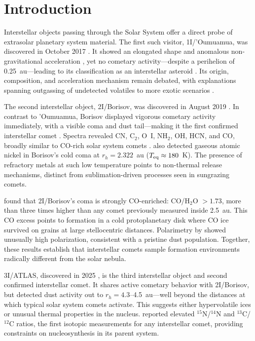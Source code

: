 \documentclass[preprint2]{aastex631}
\begin{document}
\section{Introduction}\label{sec:intro}

Interstellar objects passing through the Solar System offer a direct probe of extrasolar planetary system material. The first such visitor, 1I/'Oumuamua, was discovered in October 2017 \citep{meech17}. It showed an elongated shape and anomalous non-gravitational acceleration \citep{micheli18}, yet no cometary activity---despite a perihelion of 0.25~au---leading to its classification as an interstellar asteroid \citep{jewitt17}. Its origin, composition, and acceleration mechanism remain debated, with explanations spanning outgassing of undetected volatiles \citep{seligman23} to more exotic scenarios \citep{loeb18}.

The second interstellar object, 2I/Borisov, was discovered in August 2019 \citep{guzik19}. In contrast to 'Oumuamua, Borisov displayed vigorous cometary activity immediately, with a visible coma and dust tail---making it the first confirmed interstellar comet \citep{jewitt19}. Spectra revealed CN, C$_{2}$, O~I, NH$_{2}$, OH, HCN, and CO, broadly similar to CO-rich solar system comets \citep{fitzsimmons19,bodewits20}. \citet{guzik21} also detected gaseous atomic nickel in Borisov's cold coma at $r_h = 2.322$~au ($T_{\rm eq} \approx 180$~K). The presence of refractory metals at such low temperature points to non-thermal release mechanisms, distinct from sublimation-driven processes seen in sungrazing comets.

\citet{bodewits20} found that 2I/Borisov's coma is strongly CO-enriched: CO/H$_{2}$O $> 1.73$, more than three times higher than any comet previously measured inside 2.5~au. This CO excess points to formation in a cold protoplanetary disk where CO ice survived on grains at large stellocentric distances. Polarimetry by \citet{bagnulo22} showed unusually high polarization, consistent with a pristine dust population. Together, these results establish that interstellar comets sample formation environments radically different from the solar nebula.

3I/ATLAS, discovered in 2025 \citep{atlas25}, is the third interstellar object and second confirmed interstellar comet. It shares active cometary behavior with 2I/Borisov, but \citet{pratik26} detected dust activity out to $r_h = 4.3$--4.5~au---well beyond the distances at which typical solar system comets activate. This suggests either hypervolatile ices or unusual thermal properties in the nucleus. \citet{opitom26} reported elevated $^{15}$N/$^{14}$N and $^{13}$C/$^{12}$C ratios, the first isotopic measurements for any interstellar comet, providing constraints on nucleosynthesis in its parent system.
\end{document}
